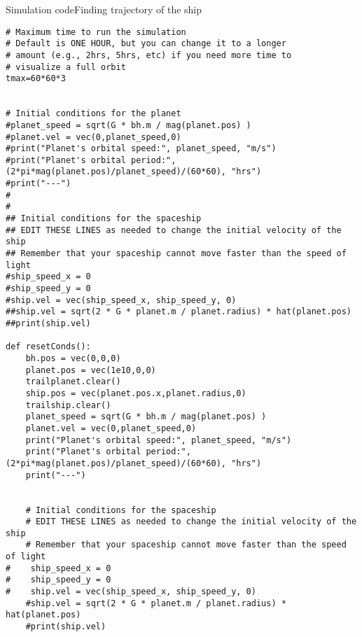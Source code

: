 \begin{frame}[fragile]{Simulation code}{Finding trajectory of the ship}
\begin{multicols}{2}
\begin{verbatim}
# Maximum time to run the simulation
# Default is ONE HOUR, but you can change it to a longer
# amount (e.g., 2hrs, 5hrs, etc) if you need more time to
# visualize a full orbit
tmax=60*60*3  


# Initial conditions for the planet 
#planet_speed = sqrt(G * bh.m / mag(planet.pos) )
#planet.vel = vec(0,planet_speed,0)
#print("Planet's orbital speed:", planet_speed, "m/s")
#print("Planet's orbital period:", (2*pi*mag(planet.pos)/planet_speed)/(60*60), "hrs")
#print("---")
#
#
## Initial conditions for the spaceship
## EDIT THESE LINES as needed to change the initial velocity of the ship
## Remember that your spaceship cannot move faster than the speed of light
#ship_speed_x = 0
#ship_speed_y = 0
#ship.vel = vec(ship_speed_x, ship_speed_y, 0)
##ship.vel = sqrt(2 * G * planet.m / planet.radius) * hat(planet.pos)
##print(ship.vel)

def resetConds():
    bh.pos = vec(0,0,0)
    planet.pos = vec(1e10,0,0)
    trailplanet.clear()
    ship.pos = vec(planet.pos.x,planet.radius,0)
    trailship.clear()
    planet_speed = sqrt(G * bh.m / mag(planet.pos) )
    planet.vel = vec(0,planet_speed,0)
    print("Planet's orbital speed:", planet_speed, "m/s")
    print("Planet's orbital period:", (2*pi*mag(planet.pos)/planet_speed)/(60*60), "hrs")
    print("---")
    
    
    # Initial conditions for the spaceship
    # EDIT THESE LINES as needed to change the initial velocity of the ship
    # Remember that your spaceship cannot move faster than the speed of light
#    ship_speed_x = 0
#    ship_speed_y = 0
#    ship.vel = vec(ship_speed_x, ship_speed_y, 0)
    #ship.vel = sqrt(2 * G * planet.m / planet.radius) * hat(planet.pos)
    #print(ship.vel)

\end{verbatim}
\end{multicols}
\end{frame}

